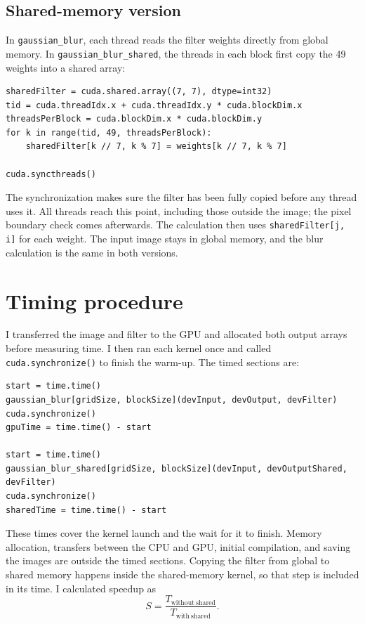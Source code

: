 \documentclass[11pt,a4paper]{article}
\begin{document}
\subsection{Shared-memory version}
In \texttt{gaussian\_blur}, each thread reads the filter weights directly
from global memory. In \texttt{gaussian\_blur\_shared}, the threads in each
block first copy the 49 weights into a shared array:
\begin{lstlisting}
sharedFilter = cuda.shared.array((7, 7), dtype=int32)
tid = cuda.threadIdx.x + cuda.threadIdx.y * cuda.blockDim.x
threadsPerBlock = cuda.blockDim.x * cuda.blockDim.y
for k in range(tid, 49, threadsPerBlock):
    sharedFilter[k // 7, k % 7] = weights[k // 7, k % 7]

cuda.syncthreads()
\end{lstlisting}

The synchronization makes sure the filter has been fully copied before
any thread uses it. All threads reach this point, including those outside
the image; the pixel boundary check comes afterwards. The calculation
then uses \texttt{sharedFilter[j, i]} for each weight. The input image
stays in global memory, and the blur calculation is the same in both
versions.

\section{Timing procedure}
I transferred the image and filter to the GPU and allocated both output
arrays before measuring time. I then ran each kernel once and called
\texttt{cuda.synchronize()} to finish the warm-up. The timed sections are:
\begin{lstlisting}
start = time.time()
gaussian_blur[gridSize, blockSize](devInput, devOutput, devFilter)
cuda.synchronize()
gpuTime = time.time() - start

start = time.time()
gaussian_blur_shared[gridSize, blockSize](devInput, devOutputShared, devFilter)
cuda.synchronize()
sharedTime = time.time() - start
\end{lstlisting}

These times cover the kernel launch and the wait for it to finish.
Memory allocation, transfers between the CPU and GPU, initial
compilation, and saving the images are outside the timed sections.
Copying the filter from global to shared memory happens inside the
shared-memory kernel, so that step is included in its time.
I calculated speedup as
\[
S=\frac{T_{\mathrm{without\ shared}}}{T_{\mathrm{with\ shared}}}.
\]
\end{document}
